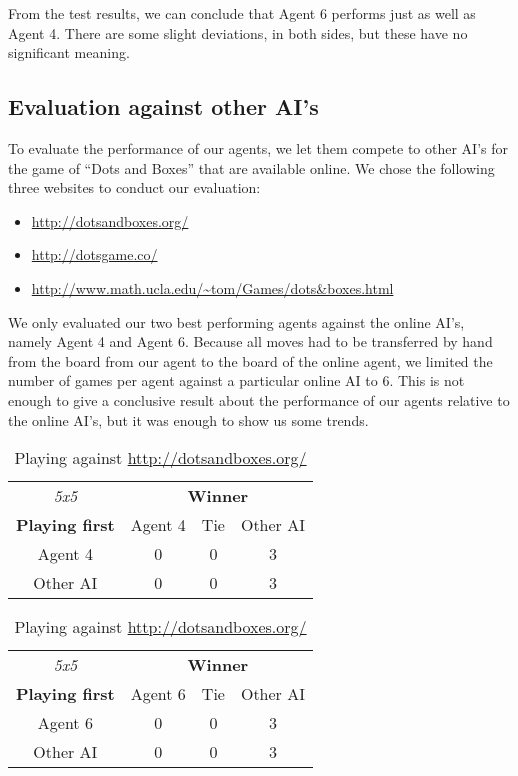 From the test results, we can conclude that Agent 6 performs just as well as Agent 4. There are some slight deviations, in both sides, but these have no significant meaning.


\subsection{Evaluation against other AI's}
To evaluate the performance of our agents, we let them compete to other AI's for the game of ``Dots and Boxes'' that are available online. We chose the following three websites to conduct our evaluation:
\begin{itemize}
	\item \url{http://dotsandboxes.org/}
	\item \url{http://dotsgame.co/}
	\item \url{http://www.math.ucla.edu/~tom/Games/dots&boxes.html}
\end{itemize}

We only evaluated our two best performing agents against the online AI's, namely Agent 4 and Agent 6.
Because all moves had to be transferred by hand from the board from our agent to the board of the online agent, we limited the number of games per agent against a particular online AI to 6. This is not enough to give a conclusive result about the performance of our agents relative to the online AI's, but it was enough to show us some trends.

\begin{table}[!h]
	\centering
	\begin{tabular}{c | c | c | c}
		\textit{5x5} & \multicolumn{3}{c}{\textbf{Winner}}        \\
		\textbf{Playing first} & Agent 4 & Tie & Other AI \\ \hline
		Agent 4 & 0 & 0 & 3 \\ \hline
		Other AI & 0 & 0 & 3
	\end{tabular}
	\quad
	\begin{tabular}{c | c | c | c}
		\textit{5x5} & \multicolumn{3}{c}{\textbf{Winner}}        \\
		\textbf{Playing first} & Agent 6 & Tie & Other AI \\ \hline
		Agent 6 & 0 & 0 & 3 \\ \hline
		Other AI & 0 & 0 & 3
	\end{tabular}
	\caption{\label{result:dotsandboxesorg}Playing against \url{http://dotsandboxes.org/}}
\end{table}


